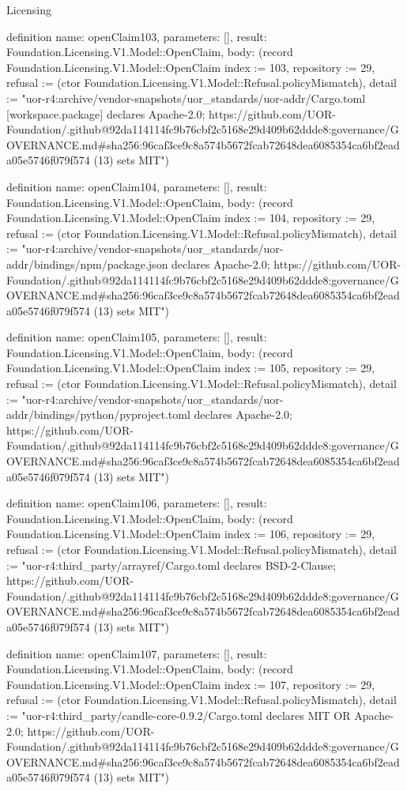 \begin{lexlean}{Licensing}
\begin{semanticmodule}
definition{
  name: openClaim103,
  parameters: [],
  result: Foundation.Licensing.V1.Model::OpenClaim,
  body: (record Foundation.Licensing.V1.Model::OpenClaim {index := 103, repository := 29, refusal := (ctor Foundation.Licensing.V1.Model::Refusal.policyMismatch), detail := "uor-r4:archive/vendor-snapshots/uor_standards/uor-addr/Cargo.toml [workspace.package] declares Apache-2.0; https://github.com/UOR-Foundation/.github@92da114114fc9b76cbf2c5168e29d409b62ddde8:governance/GOVERNANCE.md#sha256:96caf3ce9c8a574b5672fcab72648dea6085354ca6bf2eada05e5746f079f574 (13) sets MIT"})
}

definition{
  name: openClaim104,
  parameters: [],
  result: Foundation.Licensing.V1.Model::OpenClaim,
  body: (record Foundation.Licensing.V1.Model::OpenClaim {index := 104, repository := 29, refusal := (ctor Foundation.Licensing.V1.Model::Refusal.policyMismatch), detail := "uor-r4:archive/vendor-snapshots/uor_standards/uor-addr/bindings/npm/package.json declares Apache-2.0; https://github.com/UOR-Foundation/.github@92da114114fc9b76cbf2c5168e29d409b62ddde8:governance/GOVERNANCE.md#sha256:96caf3ce9c8a574b5672fcab72648dea6085354ca6bf2eada05e5746f079f574 (13) sets MIT"})
}

definition{
  name: openClaim105,
  parameters: [],
  result: Foundation.Licensing.V1.Model::OpenClaim,
  body: (record Foundation.Licensing.V1.Model::OpenClaim {index := 105, repository := 29, refusal := (ctor Foundation.Licensing.V1.Model::Refusal.policyMismatch), detail := "uor-r4:archive/vendor-snapshots/uor_standards/uor-addr/bindings/python/pyproject.toml declares Apache-2.0; https://github.com/UOR-Foundation/.github@92da114114fc9b76cbf2c5168e29d409b62ddde8:governance/GOVERNANCE.md#sha256:96caf3ce9c8a574b5672fcab72648dea6085354ca6bf2eada05e5746f079f574 (13) sets MIT"})
}

definition{
  name: openClaim106,
  parameters: [],
  result: Foundation.Licensing.V1.Model::OpenClaim,
  body: (record Foundation.Licensing.V1.Model::OpenClaim {index := 106, repository := 29, refusal := (ctor Foundation.Licensing.V1.Model::Refusal.policyMismatch), detail := "uor-r4:third_party/arrayref/Cargo.toml declares BSD-2-Clause; https://github.com/UOR-Foundation/.github@92da114114fc9b76cbf2c5168e29d409b62ddde8:governance/GOVERNANCE.md#sha256:96caf3ce9c8a574b5672fcab72648dea6085354ca6bf2eada05e5746f079f574 (13) sets MIT"})
}

definition{
  name: openClaim107,
  parameters: [],
  result: Foundation.Licensing.V1.Model::OpenClaim,
  body: (record Foundation.Licensing.V1.Model::OpenClaim {index := 107, repository := 29, refusal := (ctor Foundation.Licensing.V1.Model::Refusal.policyMismatch), detail := "uor-r4:third_party/candle-core-0.9.2/Cargo.toml declares MIT OR Apache-2.0; https://github.com/UOR-Foundation/.github@92da114114fc9b76cbf2c5168e29d409b62ddde8:governance/GOVERNANCE.md#sha256:96caf3ce9c8a574b5672fcab72648dea6085354ca6bf2eada05e5746f079f574 (13) sets MIT"})
}


\end{semanticmodule}
\end{lexlean}
